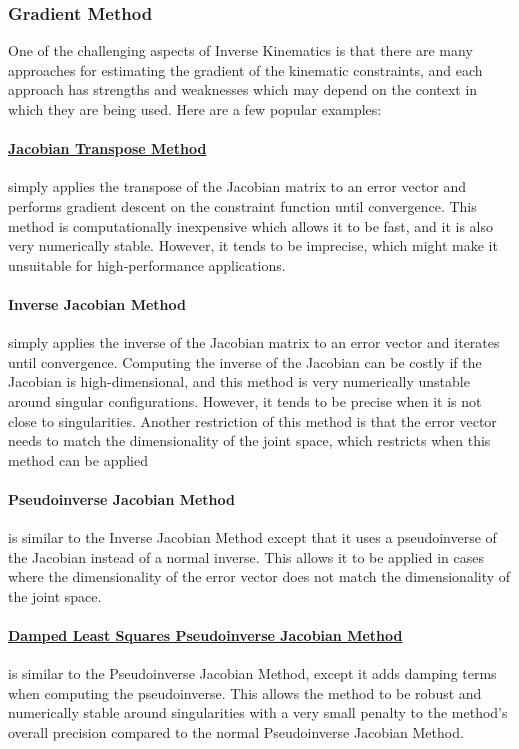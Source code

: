 \subsubsection{Gradient Method}
\label{sec:GradientMethod}

One of the challenging aspects of Inverse Kinematics is that there are many approaches for estimating the gradient of the kinematic constraints, and each approach has strengths and weaknesses which may depend on the context in which they are being used. Here are a few popular examples:

\paragraph{\underline{Jacobian Transpose Method}} simply applies the transpose of the Jacobian matrix to an error vector and performs gradient descent on the constraint function until convergence. This method is computationally inexpensive which allows it to be fast, and it is also very numerically stable. However, it tends to be imprecise, which might make it unsuitable for high-performance applications.

\paragraph{Inverse Jacobian Method} simply applies the inverse of the Jacobian matrix to an error vector and iterates until convergence. Computing the inverse of the Jacobian can be costly if the Jacobian is high-dimensional, and this method is very numerically unstable around singular configurations. However, it tends to be precise when it is not close to singularities. Another restriction of this method is that the error vector needs to match the dimensionality of the joint space, which restricts when this method can be applied

\paragraph{Pseudoinverse Jacobian Method} is similar to the Inverse Jacobian Method except that it uses a pseudoinverse of the Jacobian instead of a normal inverse. This allows it to be applied in cases where the dimensionality of the error vector does not match the dimensionality of the joint space.

\paragraph{\underline{Damped Least Squares Pseudoinverse Jacobian Method}} is similar to the Pseudoinverse Jacobian Method, except it adds damping terms when computing the pseudoinverse. This allows the method to be robust and numerically stable around singularities with a very small penalty to the method's overall precision compared to the normal Pseudoinverse Jacobian Method.

